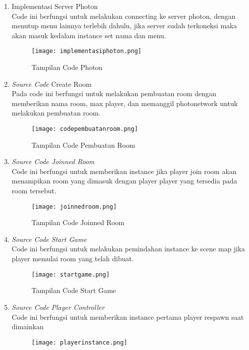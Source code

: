 \begin{enumerate}
    \item Implementasi Server Photon \\
    Code ini berfungsi untuk melakukan connecting ke server photon, dengan menutup menu lainnya terlebih dahulu, jika server sudah terkoneksi maka akan masuk kedalam instance set nama dan menu.
    \begin{figure}[h]
        \centering
        \texttt{[image: implementasiphoton.png]}
        \caption{Tampilan Code Photon}
        \label{fig:connectingp}
    \end{figure}
    \item \textit{Source Code} Create Room \\
    Pada code ini berfungsi untuk melakukan pembuatan room dengan memberikan nama room, max player, dan memanggil photonetwork untuk melakukan pembuatan room.
    \newpage
    \begin{figure}[h]
        \centering
        \texttt{[image: codepembuatanroom.png]}
        \caption{Tampilan Code Pembuatan Room}
        \label{fig:pembuatanroom}
    \end{figure}
    \item \textit{Source Code Joinned Room} \\
    Code ini berfungsi untuk memberikan instance jika player join room akan menampikan room yang dimasuk dengan player player yang tersedia pada room tersebut.
    \begin{figure}[h]
        \centering
        \texttt{[image: joinnedroom.png]}
        \caption{Tampilan Code Joinned Room}
        \label{fig:joinnedroom}
    \end{figure}
    \item \textit{Source Code Start Game}\\
    Code ini berfungsi untuk melakukan pemindahan instance ke scene map jika player memulai room yang telah dibuat.
    \begin{figure}[h]
        \centering
        \texttt{[image: startgame.png]}
        \caption{Tampilan Code Start Game}
        \label{fig:startgame}
    \end{figure}
    \newpage
    \item \textit{Source Code Player Controller} \\
    Code ini berfungsi untuk memberikan instance pertama player respawn saat dimainkan
    \begin{figure}[h]
        \centering
        \texttt{[image: playerinstance.png]}

\end{figure}
\end{enumerate}
